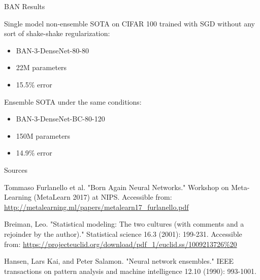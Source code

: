 \documentclass{beamer}
\begin{document}
\begin{frame}{BAN Results}

Single model non-ensemble SOTA on CIFAR 100 trained with SGD without any sort
of shake-shake regularization:
\begin{itemize}
\item BAN-3-DenseNet-80-80
\item 22M parameters
\item 15.5\% error 
\end{itemize}

\vfill

Ensemble SOTA under the same conditions:
\begin{itemize}
\item BAN-3-DenseNet-BC-80-120
\item 150M parameters
\item 14.9\% error 
\end{itemize}
\end{frame}

\begin{frame}{Sources}

\begin{thebibliography}{0}

   Tommaso Furlanello et al. "Born Again Neural Networks." Workshop on Meta-Learning (MetaLearn 2017) at NIPS. Accessible from: \url{http://metalearning.ml/papers/metalearn17_furlanello.pdf}
  
   Breiman, Leo. "Statistical modeling: The two cultures (with comments and a rejoinder by the author)." Statistical science 16.3 (2001): 199-231. Accessible from: \url{https://projecteuclid.org/download/pdf_1/euclid.ss/1009213726\%20}
  
   Hansen, Lars Kai, and Peter Salamon. "Neural network ensembles." IEEE transactions on pattern analysis and machine intelligence 12.10 (1990): 993-1001.
\end{thebibliography}

\end{frame}
\end{document}
